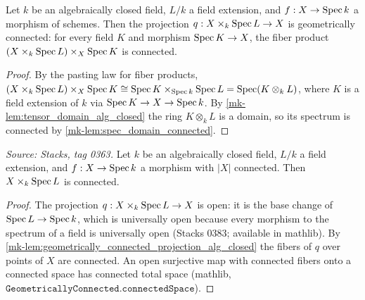 \begin{lemma}\label{mk-lem:geometrically_connected_projection_alg_closed}
  \leanok

  Let \(k\) be an algebraically closed field, \(L/k\) a field extension,
  and \(f : X \to \operatorname{Spec} k\) a morphism of schemes. Then the projection
  \(q : X \times_k \operatorname{Spec} L \to X\) is geometrically connected: for every
  field \(K\) and morphism \(\operatorname{Spec} K \to X\), the fiber product
  \((X \times_k \operatorname{Spec} L) \times_X \operatorname{Spec} K\) is connected.
\end{lemma}
\begin{proof}
  \leanok
  By the pasting law for fiber products,
  \((X \times_k \operatorname{Spec} L) \times_X \operatorname{Spec} K \cong \operatorname{Spec} K \times_{\operatorname{Spec} k}
  \operatorname{Spec} L = \operatorname{Spec} (K \otimes_k L)\), where \(K\) is a field extension of
  \(k\) via \(\operatorname{Spec} K \to X \to \operatorname{Spec} k\). By
  \ref{mk-lem:tensor_domain_alg_closed} the ring \(K \otimes_k L\) is a
  domain, so its spectrum is connected by
  \ref{mk-lem:spec_domain_connected}.
\end{proof}

\begin{lemma}\label{mk-lem:connected_base_change_alg_closed}
  \leanok

  \textit{Source: Stacks, tag 0363.}
  Let \(k\) be an algebraically closed field, \(L/k\) a field extension,
  and \(f : X \to \operatorname{Spec} k\) a morphism with \(|X|\) connected. Then
  \(X \times_k \operatorname{Spec} L\) is connected.
\end{lemma}
\begin{proof}
  \leanok
  The projection \(q : X \times_k \operatorname{Spec} L \to X\) is open: it is the
  base change of \(\operatorname{Spec} L \to \operatorname{Spec} k\), which is universally open
  because every morphism to the spectrum of a field is universally open
  (Stacks 0383; available in mathlib). By
  \ref{mk-lem:geometrically_connected_projection_alg_closed} the
  fibers of \(q\) over points of \(X\) are connected. An open
  surjective map with connected fibers onto a connected space has
  connected total space (mathlib,
  \(\texttt{GeometricallyConnected.connectedSpace}\)).
\end{proof}

